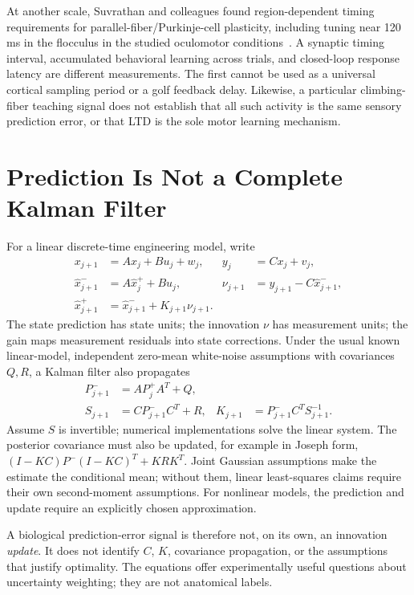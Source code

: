 At another scale, Suvrathan and colleagues found region-dependent timing
requirements for parallel-fiber/Purkinje-cell plasticity, including tuning
near 120 ms in the flocculus in the studied oculomotor conditions~\cite{Suvrathan2016}.
A synaptic timing interval, accumulated behavioral learning across trials, and
closed-loop response latency are different measurements. The first cannot be
used as a universal cortical sampling period or a golf feedback delay. Likewise,
a particular climbing-fiber teaching signal does not establish that all such
activity is the same sensory prediction error, or that LTD is the sole motor
learning mechanism.

\section{Prediction Is Not a Complete Kalman Filter}

For a linear discrete-time engineering model, write
\begin{align}
 x_{j+1}&=Ax_j+Bu_j+w_j, & y_j&=Cx_j+v_j,\\
 \hat x^-_{j+1}&=A\hat x^+_j+Bu_j, &
 \nu_{j+1}&=y_{j+1}-C\hat x^-_{j+1},\\
 \hat x^+_{j+1}&=\hat x^-_{j+1}+K_{j+1}\nu_{j+1}.
\end{align}
The state prediction has state units; the innovation $\nu$ has measurement
units; the gain maps measurement residuals into state corrections. Under the
usual known linear-model, independent zero-mean white-noise assumptions with
covariances $Q,R$, a Kalman filter also propagates
\begin{align}
 P^-_{j+1}&=AP^+_jA^T+Q,\\
 S_{j+1}&=CP^-_{j+1}C^T+R, &
 K_{j+1}&=P^-_{j+1}C^TS_{j+1}^{-1}.
\end{align}
Assume $S$ is invertible; numerical implementations solve the linear system.
The posterior covariance must also be updated, for example in Joseph form,
$(I-KC)P^-(I-KC)^T+KRK^T$. Joint Gaussian assumptions make the estimate the
conditional mean; without them, linear least-squares claims require their own
second-moment assumptions. For nonlinear models, the prediction and update
require an explicitly chosen approximation.

A biological prediction-error signal is therefore not, on its own, an
innovation \emph{update}. It does not identify $C$, $K$, covariance propagation,
or the assumptions that justify optimality. The equations offer experimentally
useful questions about uncertainty weighting; they are not anatomical labels.


